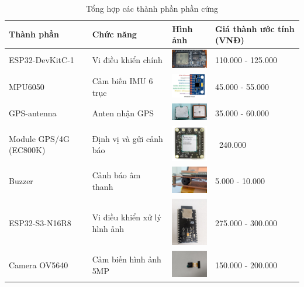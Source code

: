 \begin{table}[H]
    \centering
    \caption{Tổng hợp các thành phần phần cứng}
    \label{tab:hardware_components}
    \begin{tabular}{|l|p{5cm}|p{2cm}|l|}
    \hline
    \textbf{Thành phần} & \textbf{Chức năng} & \textbf{Hình ảnh} & \textbf{Giá thành ước tính (VNĐ)} \\
    \hline
    ESP32-DevKitC-1 & Vi điều khiển chính & \includegraphics[width=2cm]{figures/real_esp32_c1.png} & 110.000 - 125.000 \\
    MPU6050 & Cảm biến IMU 6 trục & \includegraphics[width=2cm]{figures/real_mpu6050.jpg} & 45.000 - 55.000 \\
    GPS-antenna & Anten nhận GPS & \includegraphics[width=2cm]{figures/real_gps_antenna.png} & 35.000 - 60.000 \\
    Module GPS/4G (EC800K) & Định vị và gửi cảnh báo & \includegraphics[width=2cm]{figures/real_ec800k.jpg} & ~240.000 \\
    Buzzer & Cảnh báo âm thanh & \includegraphics[width=2cm]{figures/real_buzzer.jpg} & 5.000 - 10.000 \\
    ESP32-S3-N16R8 & Vi điều khiển xử lý hình ảnh & \includegraphics[width=2cm]{figures/real_esp32_s3_2.jpg} & 275.000 - 300.000 \\
    Camera OV5640 & Cảm biến hình ảnh 5MP & \includegraphics[width=2cm]{figures/real_ov5640.jpg} & 150.000 - 200.000 \\
    \hline
    \end{tabular}
\end{table}
